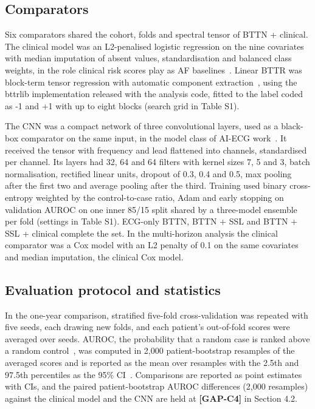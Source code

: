 \documentclass[preprint,12pt]{elsarticle}
\begin{document}
\subsection{Comparators}

Six comparators shared the cohort, folds and spectral tensor of BTTN + clinical. The clinical model was an L2-penalised logistic regression on the nine covariates with median imputation of absent values, standardisation and balanced class weights, in the role clinical risk scores play as AF baselines~\cite{schnabel2009,alonso2013,khurshid2022}. Linear BTTR was block-term tensor regression with automatic component extraction~\cite{faes2024}, using the bttrlib implementation released with the analysis code, fitted to the label coded as -1 and +1 with up to eight blocks (search grid in Table S1).

The CNN was a compact network of three convolutional layers, used as a black-box comparator on the same input, in the model class of AI-ECG work~\cite{attia2019,raghunath2021}. It received the tensor with frequency and lead flattened into channels, standardised per channel. Its layers had 32, 64 and 64 filters with kernel sizes 7, 5 and 3, batch normalisation, rectified linear units, dropout of 0.3, 0.4 and 0.5, max pooling after the first two and average pooling after the third. Training used binary cross-entropy weighted by the control-to-case ratio, Adam and early stopping on validation AUROC on one inner 85/15 split shared by a three-model ensemble per fold (settings in Table S1). ECG-only BTTN, BTTN + SSL and BTTN + SSL + clinical complete the set. In the multi-horizon analysis the clinical comparator was a Cox model with an L2 penalty of 0.1 on the same covariates and median imputation, the clinical Cox model.

\subsection{Evaluation protocol and statistics}

In the one-year comparison, stratified five-fold cross-validation was repeated with five seeds, each drawing new folds, and each patient's out-of-fold scores were averaged over seeds. AUROC, the probability that a random case is ranked above a random control~\cite{hanley1982}, was computed in 2,000 patient-bootstrap resamples of the averaged scores and is reported as the mean over resamples with the 2.5th and 97.5th percentiles as the 95\% CI~\cite{carpenter2000}. Comparisons are reported as point estimates with CIs, and the paired patient-bootstrap AUROC differences (2,000 resamples) against the clinical model and the CNN are held at \textbf{[GAP-C4]} in Section 4.2.
\end{document}
